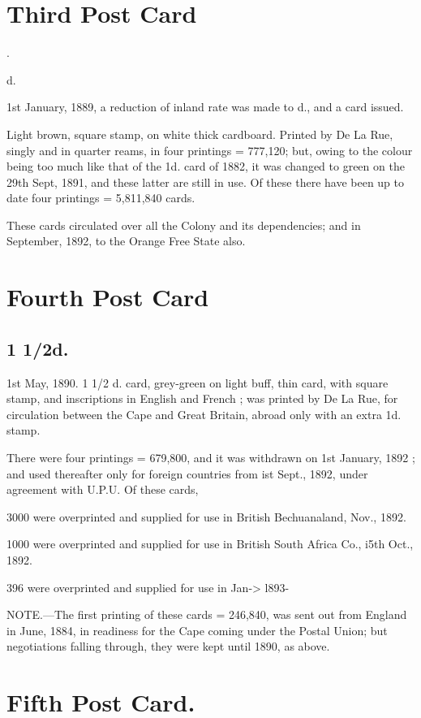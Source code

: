 \section{Third Post Card}.

\half d.

1st January, 1889, a reduction of inland rate was made to \half d., and a card
issued.

Light brown, square stamp, on white thick cardboard. Printed by De
La Rue, singly and in quarter reams, in four printings = 777,120; but,
owing to the colour being too much like that of the 1d. card of 1882,
it was changed to green on the 29th Sept, 1891, and these latter are
still in use. Of these there have been up to date four printings = 5,811,840
cards.

These cards circulated over all the Colony and its dependencies; and
in September, 1892, to the Orange Free State also.

\section{Fourth Post Card}

\subsection{1 1/2d.}

1st May, 1890. 1 1/2 d. card, grey-green on light buff, thin card, with square
stamp, and inscriptions in English and French ; was printed by De La Rue,
for circulation between the Cape and Great Britain, abroad only with an
extra 1d. stamp.

There were four printings = 679,800, and it was withdrawn on 1st
January, 1892 ; and used thereafter only for foreign countries from ist Sept.,
1892, under agreement with U.P.U.
Of these cards,

3000 were overprinted and supplied for use in British Bechuanaland, Nov., 1892.

1000 were overprinted and supplied for use in British South Africa Co., i5th Oct., 1892.

396 were overprinted and supplied for use in Jan-> l893-

NOTE.---The first printing of these cards = 246,840, was sent out from England
in June, 1884, in readiness for the Cape coming under the Postal Union; but negotiations
falling through, they were kept until 1890, as above.

\section{Fifth Post Card.}

